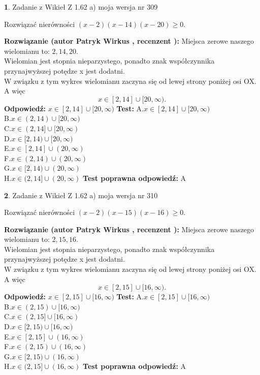 \documentclass[12pt, a4paper]{article}
\theoremstyle{definition} %
\newtheorem{zad}{}
\newcommand{\zadStart}[1]{\begin{zad}#1\newline}
\newcommand{\zadStop}{\end{zad}}
\newcommand{\rozwStart}[2]{\noindent \textbf{Rozwiązanie (autor #1 , recenzent #2): }\newline}
\newcommand{\rozwStop}{\newline}
\newcommand{\odpStart}{\noindent \textbf{Odpowiedź:}\newline}
\newcommand{\odpStop}{\newline}
\newcommand{\testStart}{\noindent \textbf{Test:}\newline}
\newcommand{\testStop}{\newline}
\newcommand{\kluczStart}{\noindent \textbf{Test poprawna odpowiedź:}\newline}
\newcommand{\kluczStop}{\newline}
\begin{document}
\zadStart{Zadanie z Wikieł Z 1.62 a) moja wersja nr 309}

Rozwiązać nierówności $(x-2)(x-14)(x-20)\ge0$.
\zadStop
\rozwStart{Patryk Wirkus}{}
Miejsca zerowe naszego wielomianu to: $2, 14, 20$.\\
Wielomian jest stopnia nieparzystego, ponadto znak współczynnika przy\linebreak najwyższej potędze x jest dodatni.\\ W związku z tym wykres wielomianu zaczyna się od lewej strony poniżej osi OX. A więc $$x \in [2,14] \cup [20,\infty).$$
\rozwStop
\odpStart
$x \in [2,14] \cup [20,\infty)$
\odpStop
\testStart
A.$x \in [2,14] \cup [20,\infty)$\\
B.$x \in (2,14) \cup [20,\infty)$\\
C.$x \in (2,14] \cup [20,\infty)$\\
D.$x \in [2,14) \cup [20,\infty)$\\
E.$x \in [2,14] \cup (20,\infty)$\\
F.$x \in (2,14) \cup (20,\infty)$\\
G.$x \in [2,14) \cup (20,\infty)$\\
H.$x \in (2,14] \cup (20,\infty)$
\testStop
\kluczStart
A
\kluczStop



\zadStart{Zadanie z Wikieł Z 1.62 a) moja wersja nr 310}

Rozwiązać nierówności $(x-2)(x-15)(x-16)\ge0$.
\zadStop
\rozwStart{Patryk Wirkus}{}
Miejsca zerowe naszego wielomianu to: $2, 15, 16$.\\
Wielomian jest stopnia nieparzystego, ponadto znak współczynnika przy\linebreak najwyższej potędze x jest dodatni.\\ W związku z tym wykres wielomianu zaczyna się od lewej strony poniżej osi OX. A więc $$x \in [2,15] \cup [16,\infty).$$
\rozwStop
\odpStart
$x \in [2,15] \cup [16,\infty)$
\odpStop
\testStart
A.$x \in [2,15] \cup [16,\infty)$\\
B.$x \in (2,15) \cup [16,\infty)$\\
C.$x \in (2,15] \cup [16,\infty)$\\
D.$x \in [2,15) \cup [16,\infty)$\\
E.$x \in [2,15] \cup (16,\infty)$\\
F.$x \in (2,15) \cup (16,\infty)$\\
G.$x \in [2,15) \cup (16,\infty)$\\
H.$x \in (2,15] \cup (16,\infty)$
\testStop
\kluczStart
A
\kluczStop
\end{document}
